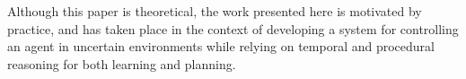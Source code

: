 \documentclass[runningheads]{llncs}
\begin{document}
Although this paper is theoretical, the work presented here is
motivated by practice, and has taken place in the context of
developing a system for controlling an agent in uncertain environments
while relying on temporal and procedural reasoning for both learning
and planning.










\end{document}
